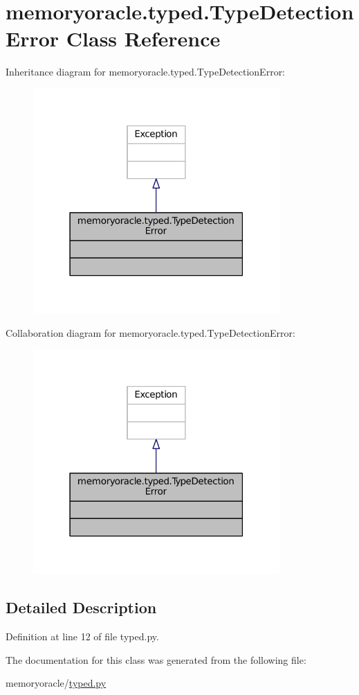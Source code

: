 \hypertarget{classmemoryoracle_1_1typed_1_1TypeDetectionError}{}\section{memoryoracle.\+typed.\+Type\+Detection\+Error Class Reference}
\label{classmemoryoracle_1_1typed_1_1TypeDetectionError}


Inheritance diagram for memoryoracle.\+typed.\+Type\+Detection\+Error\+:\nopagebreak
\begin{figure}[H]
\begin{center}
\leavevmode
\includegraphics[width=267pt]{classmemoryoracle_1_1typed_1_1TypeDetectionError__inherit__graph}
\end{center}
\end{figure}


Collaboration diagram for memoryoracle.\+typed.\+Type\+Detection\+Error\+:\nopagebreak
\begin{figure}[H]
\begin{center}
\leavevmode
\includegraphics[width=267pt]{classmemoryoracle_1_1typed_1_1TypeDetectionError__coll__graph}
\end{center}
\end{figure}


\subsection{Detailed Description}


Definition at line 12 of file typed.\+py.



The documentation for this class was generated from the following file\+:\begin{DoxyCompactItemize}
\item 
memoryoracle/\hyperlink{typed_8py}{typed.\+py}\end{DoxyCompactItemize}

